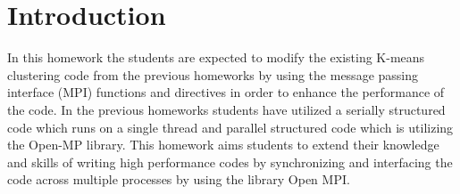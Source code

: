\section{Introduction}
In this homework the students are expected to modify the existing K-means clustering code from the previous homeworks by using the message passing interface (MPI) functions and directives in order to enhance the performance of the code. In the previous homeworks students have utilized a serially structured code which runs on a single thread and parallel structured code which is utilizing the Open-MP library. This homework aims students to extend their knowledge and skills of writing high performance codes by synchronizing and interfacing the code across multiple processes by using the library Open MPI. 